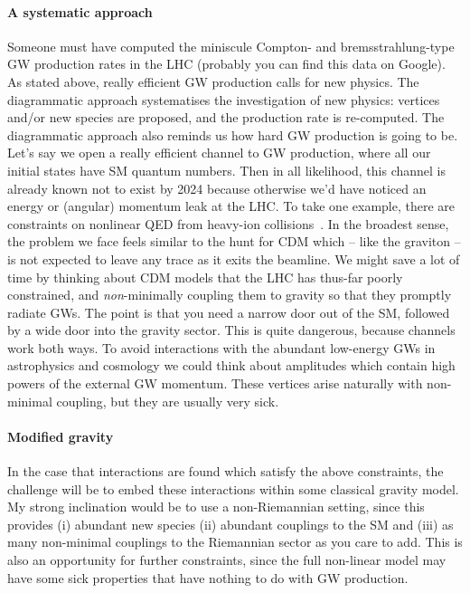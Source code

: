 \documentclass[aps,prd,reprint,preprintnumbers,showpacs,floatfix,nofootinbib,superscript address,longbibliography]{revtex4-2}
\begin{document}
\paragraph*{A systematic approach} Someone must have computed the miniscule Compton- and bremsstrahlung-type GW production rates in the LHC (probably you can find this data on Google). As stated above, really efficient GW production calls for new physics. The diagrammatic approach systematises the investigation of new physics: vertices and/or new species are proposed, and the production rate is re-computed. The diagrammatic approach also reminds us how hard GW production is going to be. Let's say we open a really efficient channel to GW production, where all our initial states have SM quantum numbers. Then in all likelihood, this channel is already known not to exist by 2024 because otherwise we'd have noticed an energy or (angular) momentum leak at the LHC. To take one example, there are constraints on nonlinear QED from heavy-ion collisions~\cite{NiauAkmansoy:2018ilv}. In the broadest sense, the problem we face feels similar to the hunt for CDM which -- like the graviton -- is not expected to leave any trace as it exits the beamline. We might save a lot of time by thinking about CDM models that the LHC has thus-far poorly constrained, and \textit{non}-minimally coupling them to gravity so that they promptly radiate GWs. The point is that you need a narrow door out of the SM, followed by a wide door into the gravity sector. This is quite dangerous, because channels work both ways. To avoid interactions with the abundant low-energy GWs in astrophysics and cosmology we could think about amplitudes which contain high powers of the external GW momentum. These vertices arise naturally with non-minimal coupling, but they are usually very sick.
\paragraph*{Modified gravity} In the case that interactions are found which satisfy the above constraints, the challenge will be to embed these interactions within some classical gravity model. My strong inclination would be to use a non-Riemannian setting, since this provides (i) abundant new species (ii) abundant couplings to the SM and (iii) as many non-minimal couplings to the Riemannian sector as you care to add. This is also an opportunity for further constraints, since the full non-linear model may have some sick properties that have nothing to do with GW production.
	
%

\end{document}
